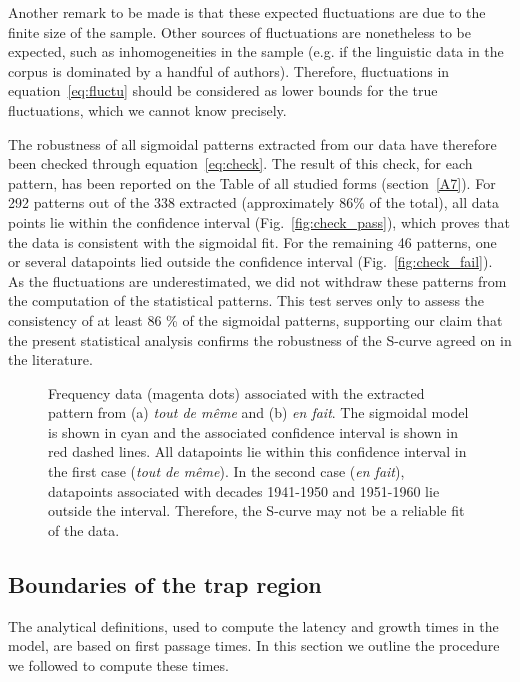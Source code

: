 \documentclass[12pt,twocolumn,amsmath,amssymb,aps,longbibliography]{revtex4-1}  %
\begin{document}
Another remark to be made is that these expected fluctuations are due to the finite size of the sample. Other sources of fluctuations are nonetheless to be expected, such as inhomogeneities in the sample (e.g. if the linguistic data in the corpus is dominated by a handful of authors). Therefore, fluctuations in equation~\eqref{eq:fluctu} should be considered as lower bounds for the true fluctuations, which we cannot know precisely.

The robustness of all sigmoidal patterns extracted from our data have therefore been checked through equation~\eqref{eq:check}. The result of this check, for each pattern, has been reported on the Table of all studied forms (section~\ref{A7}). For 292 patterns out of the 338 extracted (approximately 86\% of the total), all data points lie within the confidence interval (Fig.~\ref{fig:check_pass}), which proves that the data is consistent with the sigmoidal fit. For the remaining 46 patterns, one or several datapoints lied outside the confidence interval (Fig.~\ref{fig:check_fail}). As the fluctuations are underestimated, we did not withdraw these patterns from the computation of the statistical patterns. This test serves only to assess the consistency of at least 86 \% of the sigmoidal patterns, supporting our claim that the present statistical analysis confirms the robustness of the S-curve agreed on in the literature. 

\begin{figure}[!tbp]
  \centering
  \hfill
  \caption{Frequency data (magenta dots) associated with the extracted pattern from (a) \textit{tout de m\^eme} and (b) \textit{en fait}. The sigmoidal model is shown in cyan and the associated confidence interval is shown in red dashed lines. All datapoints lie within this confidence interval in the first case (\textit{tout de m\^eme}). In the second case (\textit{en fait}), datapoints associated with decades 1941-1950 and 1951-1960 lie outside the interval. Therefore, the S-curve may not be a reliable fit of the data.}
\end{figure}


\subsection{Boundaries of the trap region \label{IB}}

The analytical definitions, used to compute  the latency and growth times in the model, are based on first passage times. In this section we outline the procedure we followed to compute these times.
\end{document}
